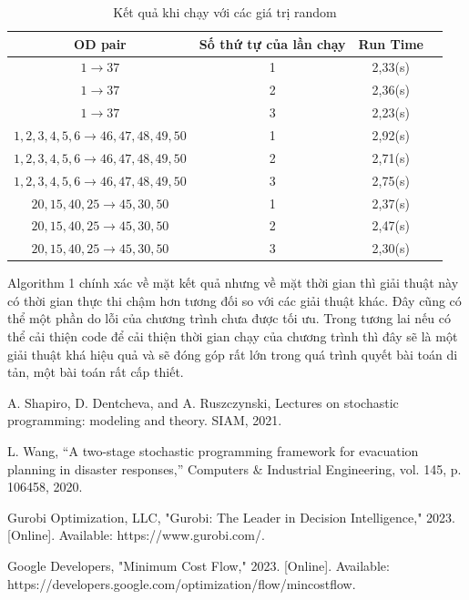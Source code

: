 \documentclass[a4paper]{article}
\begin{document}
\begin{center}
\begin{table}[h!]
  \centering
  \caption{Kết quả khi chạy với các giá trị random}
\begin{tabular}{cccc}
    \hline
    OD pair & Số thứ tự của lần chạy & Run Time \\
    \hline
    $1\rightarrow 37$ & 1 &  2,33(s)\\
    $1\rightarrow 37$& 2 & 2,36(s)\\
    $1\rightarrow 37$ & 3 &  2,23(s)\\
    $1,2,3,4,5,6 \rightarrow 46,47,48,49,50$& 1 & 2,92(s)\\
    $1,2,3,4,5,6 \rightarrow 46,47,48,49,50$& 2 & 2,71(s)\\
    $1,2,3,4,5,6 \rightarrow 46,47,48,49,50$& 3 & 2,75(s)\\
    $20,15,40,25 \rightarrow 45,30,50$& 1 & 2,37(s)\\
    $20,15,40,25 \rightarrow 45,30,50$& 2 & 2,47(s)\\
    $20,15,40,25 \rightarrow 45,30,50$& 3 & 2,30(s)\\
    \hline
  \end{tabular}
\end{table}
\end{center}
Algorithm 1 chính xác về mặt kết quả nhưng về mặt thời gian thì giải thuật này có thời gian thực thi chậm hơn tương đối so với các giải thuật khác. Đây cũng có thể một phần do lỗi của chương trình chưa được tối ưu. Trong tương lai nếu có thể cải thiện code để cải thiện thời gian chạy của chương trình thì đây sẽ là một giải thuật khá hiệu quả và sẽ đóng góp rất lớn trong quá trình quyết bài toán di tản, một bài toán rất cấp thiết.

\begin{thebibliography}{80}

A. Shapiro, D. Dentcheva, and A. Ruszczynski, Lectures on stochastic programming: modeling and theory. SIAM, 2021.

L. Wang, “A two-stage stochastic programming framework for evacuation planning in disaster responses,” Computers $\&$ Industrial Engineering, vol. 145, p. 106458, 2020.

Gurobi Optimization, LLC, "Gurobi: The Leader in Decision Intelligence," 2023. [Online]. Available: https://www.gurobi.com/.

Google Developers, "Minimum Cost Flow," 2023. [Online]. Available: https://developers.google.com/optimization/flow/mincostflow.

\end{thebibliography}
\end{document}
